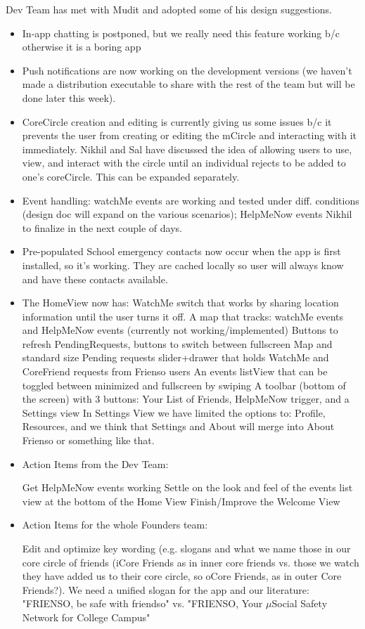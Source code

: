 Dev Team has met with Mudit and adopted some of his design suggestions.  
\begin{itemize}
\item In-app chatting is postponed, but we really need this feature working b/c otherwise it is a boring app
\item Push notifications are now working on the development versions (we haven't made a distribution executable to share with the rest of the team but will be done later this week).
\item CoreCircle creation and editing is currently giving us some issues b/c it prevents the user from creating or editing the mCircle and interacting with it immediately.  Nikhil and Sal have discussed the idea of allowing users to use, view, and interact with the circle until an individual rejects to be added to one's coreCircle.  This can be expanded separately.
\item Event handling: watchMe events are working and tested under diff. conditions (design doc will expand on the various scenarios); HelpMeNow events Nikhil to finalize in the next couple of days. 
\item Pre-populated School emergency contacts now occur when the app is first installed, so it's working.  They are cached locally so user will always know and have these contacts available.
\item The HomeView now has:
\subitem{$\cdot$} WatchMe switch that works by sharing location information until the user turns it off.
\subitem    A map that tracks: watchMe events and HelpMeNow events (currently not working/implemented)
\subitem    Buttons to refresh PendingRequests, buttons to switch between fullscreen Map and standard size
\subitem    Pending requests slider+drawer that holds WatchMe and CoreFriend requests from Frienso users
\subitem    An events listView that can be toggled between minimized and fullscreen by swiping
\subitem    A toolbar (bottom of the screen) with 3 buttons:  Your List of Friends, HelpMeNow trigger, and a Settings view
\subitem    In Settings View we have limited the options to: Profile, Resources, and we think that Settings and About will merge into About Frienso or something like that.

\item Action Items from the Dev Team: 

\subitem    Get HelpMeNow events working 
\subitem    Settle on the look and feel of the events list view at the bottom of the Home View
\subitem    Finish/Improve the Welcome View

\item Action Items for the whole Founders team:

\subitem    Edit and optimize key wording (e.g. slogans and what we name those in our core circle of friends (iCore Friends  as in inner core friends vs. those we watch they have added us to their core circle, so oCore Friends, as in outer Core Friends?).   We need a unified slogan for the app and our literature:  "FRIENSO, be safe with friendso" vs. "FRIENSO, Your $\mu$Social Safety Network for College Campus"
\end{itemize}


